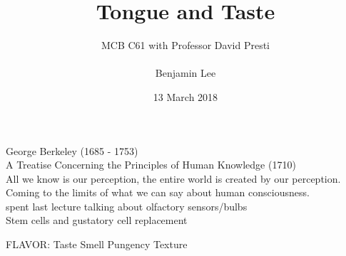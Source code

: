 \documentclass{article}
\title{Tongue and Taste}
\author{MCB C61 with Professor David Presti \\ \\ Benjamin Lee}
\date{13 March 2018}
\begin{document}
\maketitle

George Berkeley (1685 - 1753) \\
A Treatise Concerning the Principles of Human Knowledge (1710) \\
All we know is our perception, the entire world is created by our perception. \\
Coming to the limits of what we can say about human consciousness. \\
spent last lecture talking about olfactory sensors/bulbs \\

Stem cells and gustatory cell replacement

FLAVOR: 
    Taste
    Smell
    Pungency
    Texture
    
\end{document}
